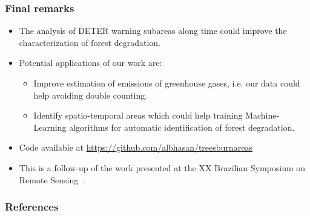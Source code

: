 \documentclass[aspectratio=169]{beamer}
\begin{document}
\begin{frame}
    \frametitle{Final remarks}
    \begin{itemize}
        \item The analysis of DETER warning subareas along time could improve 
            the characterization of forest degradation.
        \item Potential applications of our work are:
            \begin{itemize}
                \item Improve estimation of emissions of greenhouse gases, i.e.
                    our data could help avoiding double counting.
                \item Identify spatio-temporal areas which could help training 
                    Machine-Learning algorithms for automatic identification 
                    of forest degradation.
            \end{itemize}
        \item Code available at 
            \url{https://github.com/albhasan/treesburnareas}
        \item This is a follow-up of the work presented at the XX Brazilian
            Symposium on Remote Sensing~\cite{sanchez2023}.
    \end{itemize}
\end{frame}

\begin{frame}[allowframebreaks]
    \frametitle{References}
    
    
\end{frame}
\end{document}
